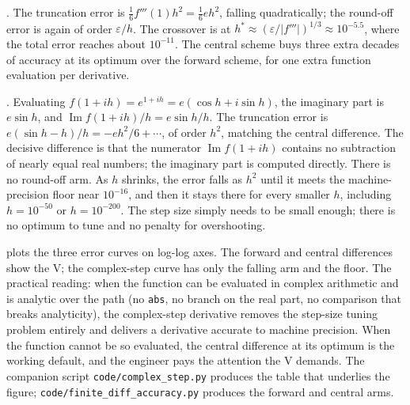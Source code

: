 . The truncation error is $\tfrac{1}{6}
f'''(1) h^{2} = \tfrac{1}{6} e h^{2}$, falling quadratically; the
round-off error is again of order $\varepsilon/h$. The crossover is
at $h^{*} \approx (\varepsilon/|f'''|)^{1/3} \approx 10^{-5.5}$,
where the total error reaches about $10^{-11}$. The central scheme
buys three extra decades of accuracy at its optimum over the
forward scheme, for one extra function evaluation per derivative.

. Evaluating $f(1 + ih) = e^{1+ih} = e
(\cos h + i \sin h)$, the imaginary part is $e \sin h$, and
$\operatorname{Im} f(1 + ih)/h = e \sin h / h$. The truncation
error is $e(\sin h - h)/h = -e h^{2}/6 + \cdots$, of order $h^{2}$,
matching the central difference. The decisive difference is that
the numerator $\operatorname{Im} f(1 + ih)$ contains no subtraction
of nearly equal real numbers; the imaginary part is computed
directly. There is no round-off arm. As $h$ shrinks, the error
falls as $h^{2}$ until it meets the machine-precision floor near
$10^{-16}$, and then it stays there for every smaller $h$,
including $h = 10^{-50}$ or $h = 10^{-200}$. The step size simply
needs to be small enough; there is no optimum to tune and no
penalty for overshooting.



 plots the three error curves on
log-log axes. The forward and central differences show the V; the
complex-step curve has only the falling arm and the floor. The
practical reading: when the function can be evaluated in complex
arithmetic and is analytic over the path (no \texttt{abs}, no
branch on the real part, no comparison that breaks analyticity),
the complex-step derivative removes the step-size tuning problem
entirely and delivers a derivative accurate to machine precision.
When the function cannot be so evaluated, the central difference at
its optimum is the working default, and the engineer pays the
attention the V demands. The companion script
\texttt{code/complex\_step.py} produces the table that underlies
the figure; \texttt{code/finite\_diff\_accuracy.py} produces the
forward and central arms.

